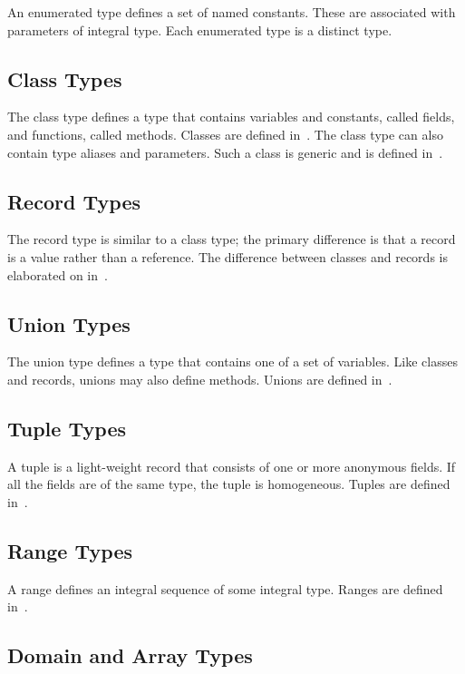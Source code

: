 An enumerated type defines a set of named constants.  These are
associated with parameters of integral type.  Each enumerated type is
a distinct type.

\subsection{Class Types}
\label{Class_Types}

The class type defines a type that contains variables and constants,
called fields, and functions, called methods.  Classes are defined
in~.  The class type can also contain type aliases and
parameters.  Such a class is generic and is defined
in~.

\subsection{Record Types}
\label{Record_Types}

The record type is similar to a class type; the primary difference is
that a record is a value rather than a reference.  The difference
between classes and records is elaborated on in~.

\subsection{Union Types}
\label{Union_Types}

The union type defines a type that contains one of a set of variables.
Like classes and records, unions may also define methods.  Unions are
defined in~.

\subsection{Tuple Types}
\label{Tuple_Types}

A tuple is a light-weight record that consists of one or more
anonymous fields.  If all the fields are of the same type, the tuple
is homogeneous.  Tuples are defined in~.

\subsection{Range Types}
\label{Range_Types}

A range defines an integral sequence of some integral type.  Ranges
are defined in~.

\subsection{Domain and Array Types}
\label{Domain_and_Array_Types}

